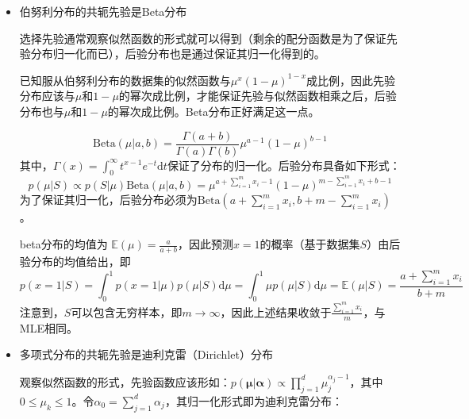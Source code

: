 \documentclass{article}
\begin{document}
	\begin{itemize}
	\item [\textbf{1}] 伯努利分布的共轭先验是Beta分布
	
	\vspace{1mm}
	\begin{scriptsize}
	\begin{spacing}{1.2}
	{\sffamily
	选择先验通常观察似然函数的形式就可以得到（剩余的配分函数是为了保证先验分布归一化而已），后验分布也是通过保证其归一化得到的。
	
	已知服从伯努利分布的数据集的似然函数与$\mu^x (1-\mu)^{1-x}$成比例，因此先验分布应该与$\mu$和$1-\mu$的幂次成比例，才能保证先验与似然函数相乘之后，后验分布也与$\mu$和$1-\mu$的幂次成比例。Beta分布正好满足这一点。
	
	\begin{equation}
	\mathrm{Beta}(\mu|a,b)=\frac{\Gamma(a+b)}{\Gamma(a)\Gamma(b)}\mu^{a-1}(1-\mu)^{b-1}
	\end{equation}
其中，$\Gamma(x)=\int^\infty_0 t^{x-1} e^{-t} \mathrm{d} t$保证了分布的归一化。后验分布具备如下形式： 
	\begin{equation*}
	p(\mu|S) \propto p(S|\mu) \mathrm{Beta}(\mu|a,b) = \mu^{a+\sum_{i=1}^m x_i-1}(1-\mu)^{m-\sum_{i=1}^m x_i + b-1}
	\end{equation*}
为了保证其归一化，后验分布必须为$\mathrm{Beta}(a+\sum_{i=1}^m x_i, b+m-\sum_{i=1}^m x_i)$。

    beta分布的均值为 $\mathbb{E}(\mu)=\frac{a}{a+b}$，因此预测$x=1$的概率（基于数据集$S$）由后验分布的均值给出，即
	\begin{equation*}
	p(x=1|S)=\int^1_0 p(x=1|\mu)p(\mu|S) \mathrm{d}\mu = \int^1_0 \mu p(\mu|S) \mathrm{d}\mu = \mathbb{E}(\mu|S) = \frac{a+\sum_{i=1}^m x_i}{b+m}
	\end{equation*}
注意到，$S$可以包含无穷样本，即$m\rightarrow\infty$，因此上述结果收敛于$\frac{\sum_{i=1}^m x_i}{m}$，与MLE相同。
	}
	\end{spacing}
	\end{scriptsize}
	\vspace{-2mm}
	
	\item [\textbf{2}] 多项式分布的共轭先验是迪利克雷（Dirichlet）分布

	\vspace{1mm}
	\begin{scriptsize}
	\begin{spacing}{1.2}
	{\sffamily
	观察似然函数的形式，先验函数应该形如：$p(\bm{\mu}|\bm{\alpha})\propto \prod_{j=1}^d \mu_j^{\alpha_j-1}$，其中$0\leq\mu_k\leq 1$。令$\alpha_0=\sum_{j=1}^d \alpha_j$，其归一化形式即为迪利克雷分布：
	
}
\end{spacing}
\end{scriptsize}
\end{itemize}
\end{document}
